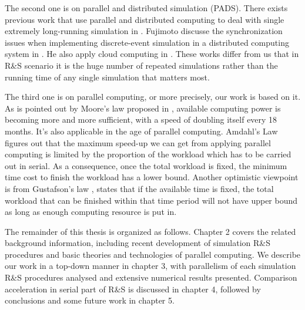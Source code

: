 The second one is on parallel and distributed simulation (PADS). There exists previous work that use parallel and distributed computing to deal with single extremely long-running simulation in \cite{potwsc05ras}. Fujimoto discusse the synchronization issues when implementing discrete-event simulation in a distributed computing system in \cite{cotacm90fuji}. He also apply cloud computing in \cite{scsmasm10fuji}. These works differ from us that in R\&S scenario it is the huge number of repeated simulations rather than the running time of any single simulation that matters most.

The third one is on parallel computing, or more precisely, our work is based on it. As is pointed out by Moore's law proposed in \cite{moore}, available computing power is becoming more and more sufficient, with a speed of doubling itself every 18 months. It's also applicable in the age of parallel computing. Amdahl's Law \cite{amdahl} figures out that the maximum speed-up we can get from applying parallel computing is limited by the proportion of the workload which has to be carried out in serial. As a consequence, once the total workload is fixed, the minimum time cost to finish the workload has a lower bound. Another optimistic viewpoint is from Gustafson's law \cite{gustafson}, states that if the available time is fixed, the total workload that can be finished within that time period will not have upper bound as long as enough computing resource is put in.

The remainder of this thesis is organized as follows. Chapter 2 covers the related background information, including recent development of simulation R\&S procedures and basic theories and technologies of parallel computing. We describe our work in a top-down manner in chapter 3, with parallelism of each simulation R\&S procedures analysed and extensive numerical results presented. Comparison acceleration in serial part of R\&S is discussed in chapter 4, followed by conclusions and some future work in chapter 5.

